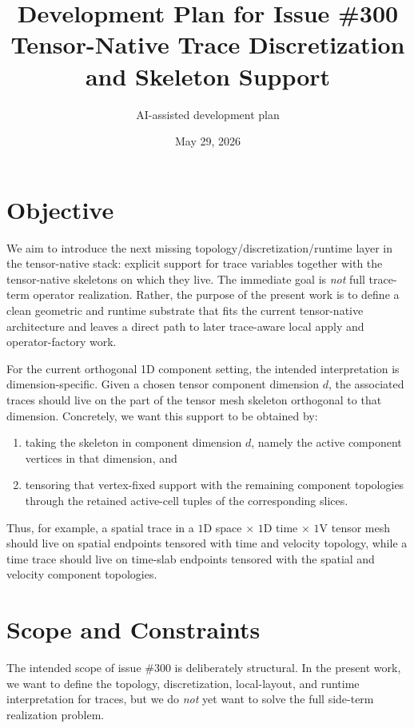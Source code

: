 \documentclass[11pt]{article}
\title{Development Plan for Issue \#300\\Tensor-Native Trace Discretization and Skeleton Support}
\author{AI-assisted development plan}
\date{May 29, 2026}
\begin{document}
\maketitle

\section{Objective}

We aim to introduce the next missing topology/discretization/runtime layer in the tensor-native stack: explicit support for trace variables together with the tensor-native skeletons on which they live. The immediate goal is \emph{not} full trace-term operator realization. Rather, the purpose of the present work is to define a clean geometric and runtime substrate that fits the current tensor-native architecture and leaves a direct path to later trace-aware local apply and operator-factory work.

For the current orthogonal 1D component setting, the intended interpretation is dimension-specific. Given a chosen tensor component dimension $d$, the associated traces should live on the part of the tensor mesh skeleton orthogonal to that dimension. Concretely, we want this support to be obtained by:
\begin{enumerate}[leftmargin=2em]
  \item taking the skeleton in component dimension $d$, namely the active component vertices in that dimension, and
  \item tensoring that vertex-fixed support with the remaining component topologies through the retained active-cell tuples of the corresponding slices.
\end{enumerate}

Thus, for example, a spatial trace in a $1$D space $\times$ $1$D time $\times$ $1$V tensor mesh should live on spatial endpoints tensored with time and velocity topology, while a time trace should live on time-slab endpoints tensored with the spatial and velocity component topologies.

\section{Scope and Constraints}

The intended scope of issue \#300 is deliberately structural. In the present work, we want to define the topology, discretization, local-layout, and runtime interpretation for traces, but we do \emph{not} yet want to solve the full side-term realization problem.
\end{document}
